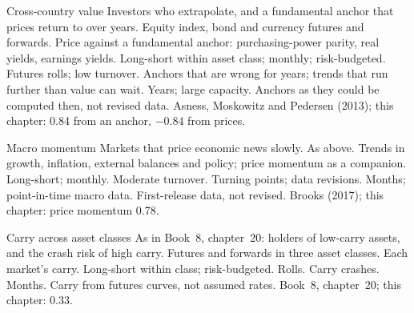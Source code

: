 \begin{strategyfile}{Cross-country value}\label{strat:s2:systematic-macro:value}
 Investors who extrapolate, and a fundamental anchor that prices return to over years.
 Equity index, bond and currency futures and forwards.
 Price against a fundamental anchor: purchasing-power parity, real yields, earnings yields.
 Long-short within asset class; monthly; risk-budgeted.
 Futures rolls; low turnover.
 Anchors that are wrong for years; trends that run further than value can wait.
 Years; large capacity.
 Anchors as they could be computed then, not revised data.
 Asness, Moskowitz and Pedersen (2013); this chapter: 0.84 from an anchor, $-0.84$ from prices.
\end{strategyfile}

\begin{strategyfile}{Macro momentum}\label{strat:s2:systematic-macro:momentum}
 Markets that price economic news slowly.
 As above.
 Trends in growth, inflation, external balances and policy; price momentum as a companion.
 Long-short; monthly.
 Moderate turnover.
 Turning points; data revisions.
 Months; point-in-time macro data.
 First-release data, not revised.
 Brooks (2017); this chapter: price momentum 0.78.
\end{strategyfile}

\begin{strategyfile}{Carry across asset classes}\label{strat:s2:systematic-macro:carry}
 As in Book~8, chapter~20: holders of low-carry assets, and the crash risk of high carry.
 Futures and forwards in three asset classes.
 Each market's carry.
 Long-short within class; risk-budgeted.
 Rolls.
 Carry crashes.
 Months.
 Carry from futures curves, not assumed rates.
 Book~8, chapter~20; this chapter: 0.33.
\end{strategyfile}

